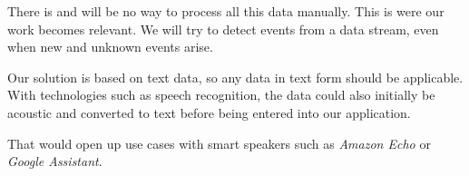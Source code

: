 There is and will be no way to process all this data manually.
This is were our work becomes relevant.
We will try to detect events from a data stream, even when new and unknown events arise.

Our solution is based on text data, so any data in text form should be applicable.
With technologies such as speech recognition, the data could also initially be acoustic
and converted to text before being entered into our application.

That would open up use cases with smart speakers such as \textit{Amazon Echo} or \textit{Google Assistant}.

